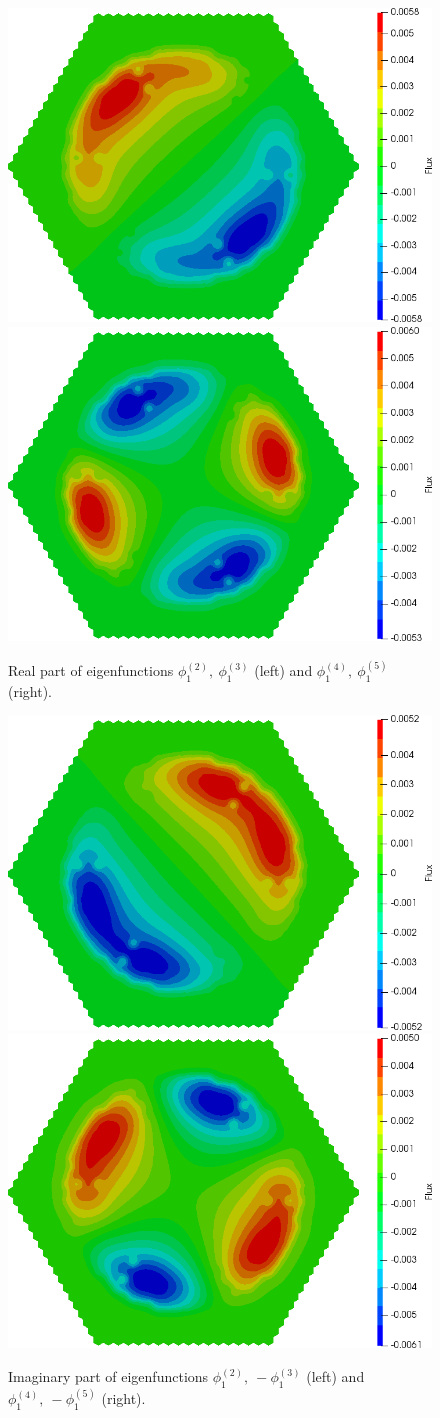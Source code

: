 \documentclass[authoryear]{elsarticle}
\begin{document}
\begin{figure}[h]
\begin{center}
	\includegraphics[width=0.49\linewidth]{hwr/alpha_sp3_rx1_2.png}
	\includegraphics[width=0.49\linewidth]{hwr/alpha_sp3_rx1_4.png}\\
	\caption{Real part of eigenfunctions $\phi^{(2)}_1, \ \phi^{(3)}_1$ (left) and $\phi^{(4)}_1, \ \phi^{(5)}_1$ (right).}
	\label{fig:hwr_fun_2}
\end{center}
\end{figure}

\begin{figure}[h]
\begin{center}
	\includegraphics[width=0.49\linewidth]{hwr/alpha_sp3_cx1_2.png}
	\includegraphics[width=0.49\linewidth]{hwr/alpha_sp3_cx1_4.png}\\
	\caption{Imaginary part of eigenfunctions $\phi^{(2)}_1, \ - \phi^{(3)}_1$ (left) and $\phi^{(4)}_1, \ - \phi^{(5)}_1$ (right).}
	\label{fig:hwr_fun_3}
\end{center}
\end{figure}
\end{document}

